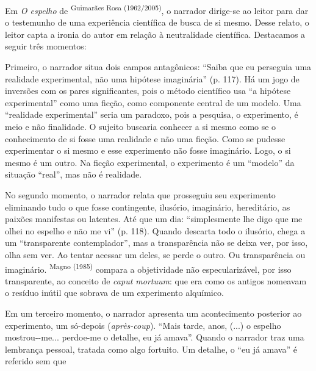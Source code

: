 \begin{multicols}{2}
\par{}Em \textit{O espelho} de \textsuperscript{Guimarães Rosa (\allowbreak{}1962\fshyp{}2005)\allowbreak{}},\allowbreak{} o narrador dirige-\allowbreak{}se ao leitor para dar o testemunho de uma experiência científica de busca de si mesmo.\allowbreak{} Desse relato,\allowbreak{} o leitor capta a ironia do autor em relação à neutralidade científica.\allowbreak{} Destacamos a seguir três momentos:\allowbreak{}\par{}Primeiro,\allowbreak{} o narrador situa dois campos antagônicos:\allowbreak{} “Saiba que eu perseguia uma realidade experimental,\allowbreak{} não uma hipótese imaginária” (\allowbreak{}p.\allowbreak{} 117)\allowbreak{}.\allowbreak{} Há um jogo de inversões com os pares significantes,\allowbreak{} pois o método científico usa “a hipótese experimental” como uma ficção,\allowbreak{} como componente central de um modelo.\allowbreak{} Uma “realidade experimental” seria um paradoxo,\allowbreak{} pois a pesquisa,\allowbreak{} o experimento,\allowbreak{} é meio e não finalidade.\allowbreak{} O sujeito buscaria conhecer a si mesmo como se o conhecimento de si fosse uma realidade e não uma ficção.\allowbreak{} Como se pudesse experimentar o si mesmo e esse experimento não fosse imaginário.\allowbreak{} Logo,\allowbreak{} o si mesmo é um outro.\allowbreak{} Na ficção experimental,\allowbreak{} o experimento é um “modelo” da situação “real”,\allowbreak{} mas não é realidade.\allowbreak{}\par{}No segundo momento,\allowbreak{} o narrador relata que prosseguiu seu experimento eliminando tudo o que fosse contingente,\allowbreak{} ilusório,\allowbreak{} imaginário,\allowbreak{} hereditário,\allowbreak{} as paixões manifestas ou latentes.\allowbreak{} Até que um dia:\allowbreak{} “simplesmente lhe digo que me olhei no espelho e não me vi” (\allowbreak{}p.\allowbreak{} 118)\allowbreak{}.\allowbreak{} Quando descarta todo o ilusório,\allowbreak{} chega a um “transparente contemplador”,\allowbreak{} mas a transparência não se deixa ver,\allowbreak{} por isso,\allowbreak{} olha sem ver.\allowbreak{} Ao tentar acessar um deles,\allowbreak{} se perde o outro.\allowbreak{} Ou transparência ou imaginário.\allowbreak{} \textsuperscript{Magno (\allowbreak{}1985)\allowbreak{}} compara a objetividade não especularizável,\allowbreak{} por isso transparente,\allowbreak{} ao conceito de \textit{caput mortuum}:\allowbreak{} que era como os antigos nomeavam o resíduo inútil que sobrava de um experimento alquímico.\allowbreak{}\par{}Em um terceiro momento,\allowbreak{} o narrador apresenta um acontecimento posterior ao experimento,\allowbreak{} um só-\allowbreak{}depois (\allowbreak{}\textit{après-\allowbreak{}coup})\allowbreak{}.\allowbreak{} “Mais tarde,\allowbreak{} anos,\allowbreak{} (\allowbreak{}.\allowbreak{}.\allowbreak{}.\allowbreak{})\allowbreak{} o espelho mostrou-\allowbreak{}-\allowbreak{}me.\allowbreak{}.\allowbreak{}.\allowbreak{} perdoe-\allowbreak{}me o detalhe,\allowbreak{} eu já amava”.\allowbreak{} Quando o narrador traz uma lembrança pessoal,\allowbreak{} tratada como algo fortuito.\allowbreak{} Um detalhe,\allowbreak{} o “eu já amava” é referido sem que 
\end{multicols}
